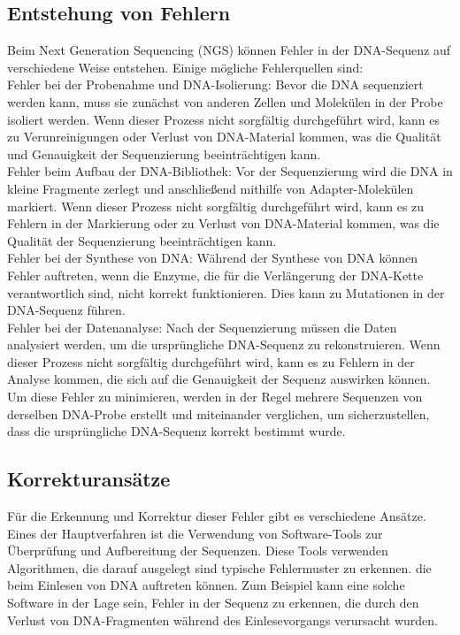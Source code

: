 \documentclass[oneside,bibliography=totocnumbered,BCOR=5mm]{scrbook}%
\theoremstyle{definition}
\theoremstyle{definition}
\theoremstyle{definition}
\theoremstyle{definition}
\theoremstyle{definition}
\theoremstyle{definition}
\begin{document}
\subsection{Entstehung von Fehlern}


Beim Next Generation Sequencing (NGS) können Fehler in der DNA-Sequenz auf verschiedene Weise entstehen. 
Einige mögliche Fehlerquellen sind:  \\


Fehler bei der Probenahme und DNA-Isolierung: Bevor die DNA sequenziert werden kann, 
muss sie zunächst von anderen Zellen und Molekülen in der Probe isoliert werden. 
Wenn dieser Prozess nicht sorgfältig durchgeführt wird, kann es zu Verunreinigungen oder Verlust von 
DNA-Material kommen, was die Qualität und Genauigkeit der Sequenzierung beeinträchtigen kann.  \\


Fehler beim Aufbau der DNA-Bibliothek: Vor der Sequenzierung wird die DNA in kleine Fragmente zerlegt und 
anschließend mithilfe von Adapter-Molekülen markiert. Wenn dieser Prozess nicht sorgfältig durchgeführt wird, 
kann es zu Fehlern in der Markierung oder zu Verlust von DNA-Material kommen, 
was die Qualität der Sequenzierung beeinträchtigen kann.  \\


Fehler bei der Synthese von DNA: Während der Synthese von DNA können Fehler auftreten, 
wenn die Enzyme, die für die Verlängerung der DNA-Kette verantwortlich sind, nicht korrekt funktionieren. 
Dies kann zu Mutationen in der DNA-Sequenz führen. \\


Fehler bei der Datenanalyse: Nach der Sequenzierung müssen die Daten analysiert werden, 
um die ursprüngliche DNA-Sequenz zu rekonstruieren. Wenn dieser Prozess nicht sorgfältig durchgeführt wird, 
kann es zu Fehlern in der Analyse kommen, die sich auf die Genauigkeit der Sequenz auswirken können. \\


Um diese Fehler zu minimieren, werden in der Regel mehrere Sequenzen von derselben DNA-Probe erstellt und miteinander verglichen, 
um sicherzustellen, dass die ursprüngliche DNA-Sequenz korrekt bestimmt wurde.


\subsection{Korrekturansätze}


Für die Erkennung und Korrektur dieser Fehler gibt es verschiedene Ansätze. Eines der Hauptverfahren ist die Verwendung von Software-Tools zur Überprüfung und Aufbereitung der Sequenzen. 
Diese Tools verwenden Algorithmen, die darauf ausgelegt sind typische Fehlermuster zu erkennen. 
die beim Einlesen von DNA auftreten können. 
Zum Beispiel kann eine solche Software in der Lage sein, Fehler in der Sequenz zu erkennen, 
die durch den Verlust von DNA-Fragmenten während des Einlesevorgangs verursacht wurden.  \\
\end{document}
